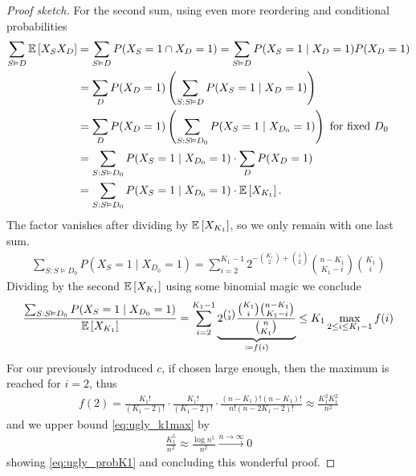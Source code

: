 \begin{proof}[Proof sketch]
    For the second sum, using even more reordering and conditional probabilities
    \begin{align*}
        \sum_{S \vDash D} \mathbb{E}\left[X_SX_D\right] & = \sum_{S \vDash D} P( X_S = 1 \cap X_D = 1) = \sum_{S \vDash D} P( X_S = 1 \mid X_D = 1)P(X_D=1)    \\
                                          & = \sum_D P(X_D=1) \left(\sum_{S: S \vDash D} P(X_S=1 \mid X_D=1)\right)                              \\
                                          & = \sum_D P(X_D=1) \left(\sum_{S: S \vDash D_0} P(X_S=1 \mid X_{D_0}=1)\right) \text{ for fixed } D_0 \\
                                          & = \sum_{S: S \vDash D_0} P(X_S=1 \mid X_{D_0}=1) \cdot \sum_D P(X_D=1)                               \\
                                          & = \sum_{S: S \vDash D_0} P(X_S=1 \mid X_{D_0}=1) \cdot \mathbb{E}\left[X_{K_1}\right].
    \end{align*}
    The factor vanishes after dividing by $\mathbb{E}\left[X_{K_1}\right]$, so we only remain with one last sum.
    \begin{align*}
        \sum_{S: S \vDash D_0} P(X_S=1 \mid X_{D_0}=1) = \sum_{i=2}^{K_1 - 1}2^{-\binom{K_1}{2} + \binom{i}{2}}\binom{n - K_1}{K_1 - i}\binom{K_1}{i}
    \end{align*}
    Dividing by the second $\mathbb{E}\left[X_{K_1}\right]$ using some binomial magic we conclude
    \begin{align}\label{eq:ugly_k1max}
        \frac{\sum_{S: S \vDash D_0} P(X_S=1 \mid X_{D_0}=1)}{\mathbb{E}\left[X_{K_1}\right]} = \sum_{i=2}^{K_1 - 1} \underbrace{2^{\binom{i}{2}} \frac{\binom{K_1}{i}\binom{n - K_1}{K_1 - i}}{\binom{n}{K_1}}}_{\coloneqq f(i)} \leq K_1 \max_{2 \leq i \leq K_1 - 1} f(i)
    \end{align}
    For our previously introduced $c$, if chosen large enough, then the maximum is reached for $i=2$, thus
    \begin{align*}
        f(2) = \frac{K_1!}{(K_1-2)!}\cdot \frac{K_1!}{(K_1-2)!} \cdot \frac{(n-K_1)!(n-K_1)!}{n!(n-2K_1-2)!} \approx \frac{K_1^2K_1^2}{n^2}
    \end{align*}
    and we upper bound \eqref{eq:ugly_k1max} by
    \begin{align*}
        \frac{K_1^5}{n^2} \approx \frac{\log n^5}{n^2} \xrightarrow{n \rightarrow \infty} 0
    \end{align*}
    showing \eqref{eq:ugly_probK1} and concluding this wonderful proof.
\end{proof}
